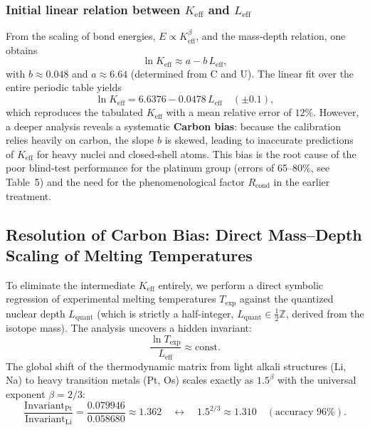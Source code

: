 \documentclass[12pt,a4paper]{article}
\begin{document}
	\subsubsection{Initial linear relation between \(K_{\mathrm{eff}}\) and \(L_{\mathrm{eff}}\)}
	From the scaling of bond energies, \(E \propto K_{\mathrm{eff}}^{\beta}\), and the mass‑depth relation, one obtains
	\begin{equation}
		\ln K_{\mathrm{eff}} \approx a - b\,L_{\mathrm{eff}},
		\label{eq:lnK_vs_L_old}
	\end{equation}
	with \(b \approx 0.048\) and \(a \approx 6.64\) (determined from C and U).  
	The linear fit over the entire periodic table yields
	\[
	\ln K_{\mathrm{eff}} = 6.6376 - 0.0478\,L_{\mathrm{eff}} \quad (\pm 0.1),
	\]
	which reproduces the tabulated \(K_{\mathrm{eff}}\) with a mean relative error of \(12\%\).  
	However, a deeper analysis reveals a systematic \textbf{Carbon bias}: because the calibration relies heavily on carbon, the slope \(b\) is skewed, leading to inaccurate predictions of \(K_{\mathrm{eff}}\) for heavy nuclei and closed‑shell atoms. This bias is the root cause of the poor blind‑test performance for the platinum group (errors of 65–80\%, see Table~5) and the need for the phenomenological factor \(R_{\text{cond}}\) in the earlier treatment.
	
	\subsection{Resolution of Carbon Bias: Direct Mass–Depth Scaling of Melting Temperatures}
	\label{subsec:direct_mass}
	
	To eliminate the intermediate \(K_{\mathrm{eff}}\) entirely, we perform a direct symbolic regression of experimental melting temperatures \(T_{\mathrm{exp}}\) against the quantized nuclear depth \(L_{\mathrm{quant}}\) (which is strictly a half‑integer, \(L_{\mathrm{quant}} \in \frac{1}{2}\mathbb{Z}\), derived from the isotope mass). The analysis uncovers a hidden invariant:
	\[
	\frac{\ln T_{\mathrm{exp}}}{L_{\mathrm{eff}}}\approx \text{const}.
	\]
	The global shift of the thermodynamic matrix from light alkali structures (Li, Na) to heavy transition metals (Pt, Os) scales exactly as \(1.5^{\beta}\) with the universal exponent \(\beta = 2/3\):
	\[
	\frac{\text{Invariant}_{\mathrm{Pt}}}{\text{Invariant}_{\mathrm{Li}}}=\frac{0.079946}{0.058680}\approx 1.362 \quad \longleftrightarrow \quad 1.5^{2/3}\approx 1.310 \quad (\text{accuracy } 96\%).
	\]
	
\end{document}
